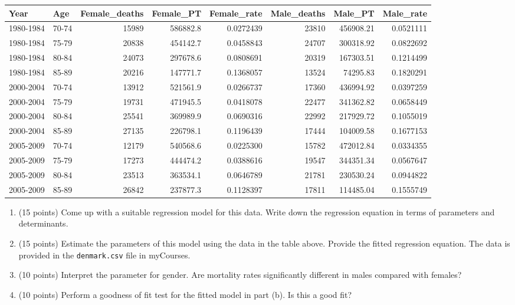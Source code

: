 \documentclass[letterpaper,12pt,twoside,]{pinp}
\providecommand{\tightlist}{%
  \setlength{\itemsep}{0pt}\setlength{\parskip}{0pt}}
\begin{document}
\begin{tabular}{l|l|r|r|r|r|r|r}
\hline
Year & Age & Female\_deaths & Female\_PT & Female\_rate & Male\_deaths & Male\_PT & Male\_rate\\
\hline
1980-1984 & 70-74 & 15989 & 586882.8 & 0.0272439 & 23810 & 456908.21 & 0.0521111\\
\hline
1980-1984 & 75-79 & 20838 & 454142.7 & 0.0458843 & 24707 & 300318.92 & 0.0822692\\
\hline
1980-1984 & 80-84 & 24073 & 297678.6 & 0.0808691 & 20319 & 167303.51 & 0.1214499\\
\hline
1980-1984 & 85-89 & 20216 & 147771.7 & 0.1368057 & 13524 & 74295.83 & 0.1820291\\
\hline
2000-2004 & 70-74 & 13912 & 521561.9 & 0.0266737 & 17360 & 436994.92 & 0.0397259\\
\hline
2000-2004 & 75-79 & 19731 & 471945.5 & 0.0418078 & 22477 & 341362.82 & 0.0658449\\
\hline
2000-2004 & 80-84 & 25541 & 369989.9 & 0.0690316 & 22992 & 217929.72 & 0.1055019\\
\hline
2000-2004 & 85-89 & 27135 & 226798.1 & 0.1196439 & 17444 & 104009.58 & 0.1677153\\
\hline
2005-2009 & 70-74 & 12179 & 540568.6 & 0.0225300 & 15782 & 472012.84 & 0.0334355\\
\hline
2005-2009 & 75-79 & 17273 & 444474.2 & 0.0388616 & 19547 & 344351.34 & 0.0567647\\
\hline
2005-2009 & 80-84 & 23513 & 363534.1 & 0.0646789 & 21781 & 230530.24 & 0.0944822\\
\hline
2005-2009 & 85-89 & 26842 & 237877.3 & 0.1128397 & 17811 & 114485.04 & 0.1555749\\
\hline
\end{tabular}

\begin{enumerate}
\def\labelenumi{\alph{enumi}.}
\tightlist
\item
  (15 points) Come up with a suitable regression model for this data.
  Write down the regression equation in terms of parameters and
  determinants.
\item
  (15 points) Estimate the parameters of this model using the data in
  the table above. Provide the fitted regression equation. The data is
  provided in the \texttt{denmark.csv} file in myCourses.
\item
  (10 points) Interpret the parameter for gender. Are mortality rates
  significantly different in males compared with females?
\item
  (10 points) Perform a goodness of fit test for the fitted model in
  part (b). Is this a good fit?
\end{enumerate}
\end{document}
